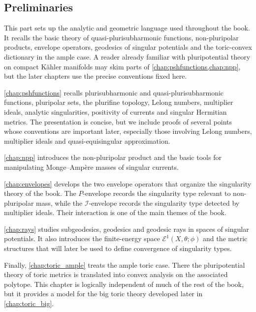 \begin{partbacktext}
\part{Preliminaries}
\noindent
This part sets up the analytic and geometric language used throughout the book. It recalls the basic theory of quasi-plurisubharmonic functions, non-pluripolar products, envelope operators, geodesics of singular potentials and the toric-convex dictionary in the ample case. A reader already familiar with pluripotential theory on compact K\"ahler manifolds may skim parts of \cref{chap:pshfunctions,chap:npp}, but the later chapters use the precise conventions fixed here.

\cref{chap:pshfunctions} recalls plurisubharmonic and quasi-plurisubharmonic functions, pluripolar sets, the plurifine topology, Lelong numbers, multiplier ideals, analytic singularities, positivity of currents and singular Hermitian metrics. The presentation is concise, but we include proofs of several points whose conventions are important later, especially those involving Lelong numbers, multiplier ideals and quasi-equisingular approximation.

\cref{chap:npp} introduces the non-pluripolar product and the basic tools for manipulating Monge--Amp\`ere masses of singular currents.

\cref{chap:envelopes} develops the two envelope operators that organize the singularity theory of the book. The $P$-envelope records the singularity type relevant to non-pluripolar mass, while the $\mathcal I$-envelope records the singularity type detected by multiplier ideals. Their interaction is one of the main themes of the book.

\cref{chap:rays} studies subgeodesics, geodesics and geodesic rays in spaces of singular potentials. It also introduces the finite-energy space $\mathcal E^1(X,\theta;\phi)$ and the metric structures that will later be used to define convergence of singularity types.

Finally, \cref{chap:toric_ample} treats the ample toric case. There the pluripotential theory of toric metrics is translated into convex analysis on the associated polytope. This chapter is logically independent of much of the rest of the book, but it provides a model for the big toric theory developed later in \cref{chap:toric_big}.
\end{partbacktext}

